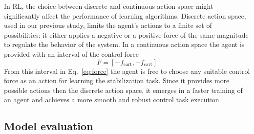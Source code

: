 In RL, the choice between discrete and continuous action space might significantly affect the performance of learning algorithms. Discrete action space, used in our previous study, limits the agent’s actions to a finite set of possibilities: it either applies a negative or a positive force of the same magnitude to regulate the behavior of the system. In a continuous action space the agent is provided with an interval of the control force
\begin{equation}
F = [-f_\mathrm{cart}, +f_\mathrm{cart}]
\label{eq:force}
\end{equation}
From this interval in Eq.~\eqref{eq:force} the agent is free to choose any suitable control force as an action for learning the stabilization task. Since it provides more possible actions then the discrete action space, it emerges in a faster training of an agent and achieves a more smooth and robust control task execution.  

\subsection{Model evaluation} \label{subsec: Model evaluation}

